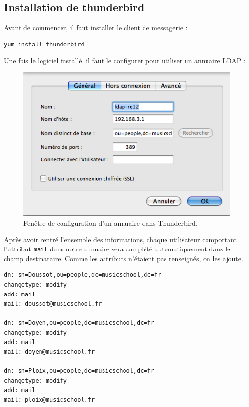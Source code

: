 \documentclass[12pt,a4paper,notitlepage]{article}
\begin{document}
\subsection{Installation de thunderbird}

Avant de commencer, il faut installer le client de messagerie :
\begin{verbatim}
yum install thunderbird
\end{verbatim}

\bigskip

Une fois le logiciel installé, il faut le configurer pour utiliser un annuaire LDAP :

\begin{figure}[!h]
\begin{center}
\includegraphics[scale=0.61]{thunderbird-ldap}
\caption{Fenêtre de configuration d'un annuaire dans Thunderbird.}
\label{fig:da}
\end{center}
\end{figure}

Après avoir rentré l'ensemble des informations, chaque utilisateur comportant l'attribut \texttt{mail} dans notre annuaire sera complété automatiquement dans le champ destinataire. Comme les attributs n'étaient pas renseignés, on les ajoute.\\

\begin{lstlisting}[title=ajout-mail.ldif]
dn: sn=Doussot,ou=people,dc=musicschool,dc=fr
changetype: modify
add: mail
mail: doussot@musicschool.fr

dn: sn=Doyen,ou=people,dc=musicschool,dc=fr
changetype: modify
add: mail
mail: doyen@musicschool.fr

dn: sn=Ploix,ou=people,dc=musicschool,dc=fr
changetype: modify
add: mail
mail: ploix@musicschool.fr
\end{lstlisting}
\end{document}
